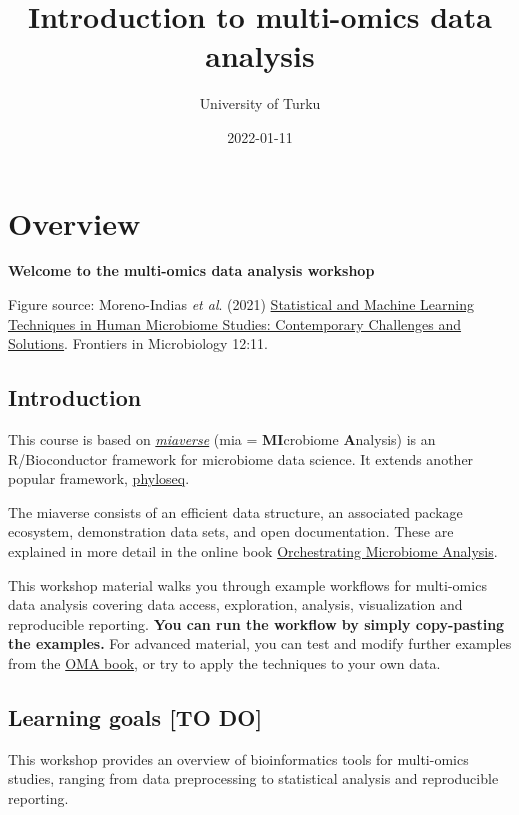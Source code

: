 \documentclass[
  oneside]{book}
\title{Introduction to multi-omics data analysis}
\author{University of Turku}
\date{2022-01-11}
\begin{document}
\maketitle

{
\setcounter{tocdepth}{1}
\tableofcontents
}
\hypertarget{overview}{%
\chapter{Overview}\label{overview}}

\textbf{Welcome to the multi-omics data analysis workshop}

Figure source: Moreno-Indias \emph{et al}. (2021) \href{https://doi.org/10.3389/fmicb.2021.635781}{Statistical and Machine Learning Techniques in Human Microbiome Studies: Contemporary Challenges and Solutions}. Frontiers in Microbiology 12:11.

\hypertarget{introduction}{%
\section{Introduction}\label{introduction}}

This course is based on \href{https://microbiome.github.io}{\emph{miaverse}} (mia = \textbf{MI}crobiome \textbf{A}nalysis) is an
R/Bioconductor framework for microbiome data science. It extends another popular framework, \href{https://joey711.github.io/phyloseq/}{phyloseq}.

The miaverse consists of an efficient data structure, an
associated package ecosystem, demonstration data sets, and open
documentation. These are explained in more detail in the online book
\href{https://microbiome.github.io/OMA}{Orchestrating Microbiome Analysis}.

This workshop material walks you through example workflows for multi-omics data
analysis covering data access, exploration, analysis, visualization and reproducible
reporting. \textbf{You can run the workflow by simply copy-pasting the
examples.} For advanced material, you can test and modify further
examples from the \href{https://microbiome.github.io/OMA}{OMA book}, or try
to apply the techniques to your own data.

\hypertarget{learning-goals-to-do}{%
\section{Learning goals {[}TO DO{]}}\label{learning-goals-to-do}}

This workshop provides an overview of bioinformatics
tools for multi-omics studies, ranging from data
preprocessing to statistical analysis and reproducible reporting.
\end{document}
